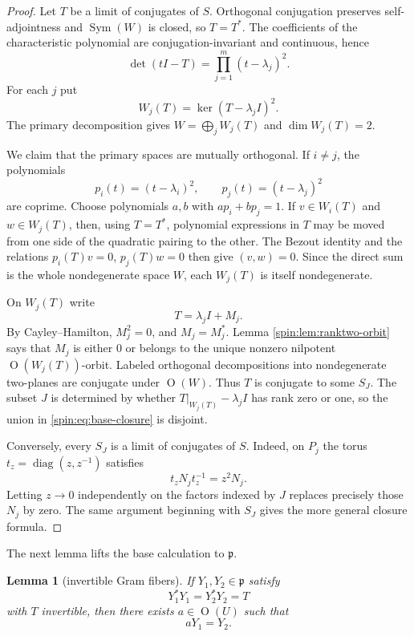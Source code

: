 \documentclass[11pt,reqno]{amsart}
\numberwithin{equation}{section}
\newtheorem{lemma}[theorem]{Lemma}
\theoremstyle{definition}
\theoremstyle{remark}
\newcommand{\Or}{\operatorname{O}}
\newcommand{\Sym}{\operatorname{Sym}}
\newcommand{\diag}{\operatorname{diag}}
\newcommand{\fp}{\mathfrak p}
\begin{document}
\begin{proof}
Let $T$ be a limit of conjugates of $S$.  Orthogonal conjugation preserves
self-adjointness and $\Sym(W)$ is closed, so $T=T^*$.  The coefficients of
the characteristic polynomial are conjugation-invariant and continuous, hence
\begin{equation}\label{spin:eq:charpoly}
  \det(tI-T)=\prod_{j=1}^m(t-\lambda_j)^2.
\end{equation}
For each $j$ put
\[
  W_j(T)=\ker(T-\lambda_jI)^2.
\]
The primary decomposition gives
$W=\bigoplus_jW_j(T)$ and $\dim W_j(T)=2$.

We claim that the primary spaces are mutually orthogonal.  If $i\ne j$, the
polynomials
\[
  p_i(t)=(t-\lambda_i)^2,
  \qquad
  p_j(t)=(t-\lambda_j)^2
\]
are coprime.  Choose polynomials $a,b$ with $ap_i+bp_j=1$.  If
$v\in W_i(T)$ and $w\in W_j(T)$, then, using $T=T^*$, polynomial expressions
in $T$ may be moved from one side of the quadratic pairing to the other.  The
Bezout identity and the relations $p_i(T)v=0$, $p_j(T)w=0$ then give
$(v,w)=0$.  Since the direct sum is the whole nondegenerate space $W$, each
$W_j(T)$ is itself nondegenerate.

On $W_j(T)$ write
\[
  T=\lambda_jI+M_j.
\]
By Cayley--Hamilton, $M_j^2=0$, and $M_j=M_j^*$.  Lemma
\ref{spin:lem:ranktwo-orbit} says that $M_j$ is either $0$ or belongs to the unique
nonzero nilpotent $\Or(W_j(T))$-orbit.  Labeled orthogonal decompositions into
nondegenerate two-planes are conjugate under $\Or(W)$.  Thus $T$ is conjugate
to some $S_J$.  The subset $J$ is determined by whether
$T|_{W_j(T)}-\lambda_jI$ has rank zero or one, so the union in
\eqref{spin:eq:base-closure} is disjoint.

Conversely, every $S_J$ is a limit of conjugates of $S$.  Indeed, on $P_j$ the
torus $t_z=\diag(z,z^{-1})$ satisfies
\[
  t_zN_jt_z^{-1}=z^2N_j.
\]
Letting $z\to0$ independently on the factors indexed by $J$ replaces precisely
those $N_j$ by zero.  The same argument beginning with $S_J$ gives the more
general closure formula.
\end{proof}

The next lemma lifts the base calculation to $\fp$.

\begin{lemma}[invertible Gram fibers]\label{spin:lem:gram-fiber}
If $Y_1,Y_2\in\fp$ satisfy
\[
  Y_1^*Y_1=Y_2^*Y_2=T
\]
with $T$ invertible, then there exists $a\in\Or(U)$ such that
\[
  aY_1=Y_2.
\]
\end{lemma}
\end{document}
